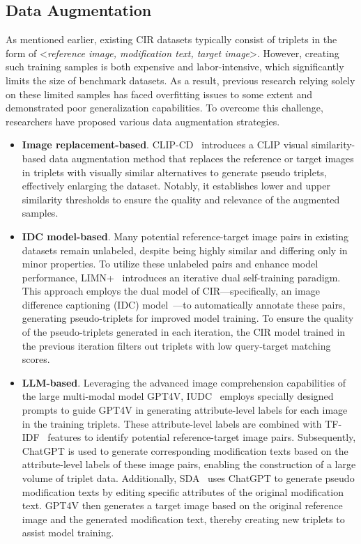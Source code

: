 \subsection{Data Augmentation}
As mentioned earlier, existing CIR datasets typically consist of triplets in the form of \textless \emph{reference image, modification text, target image}\textgreater. However, creating such training samples is both expensive and labor-intensive, which significantly limits the size of benchmark datasets. As a result, previous research relying solely on these limited samples has faced overfitting issues to some extent and demonstrated poor generalization capabilities.
To overcome this challenge, researchers have proposed various data augmentation strategies.
\begin{itemize}
    \item \textbf{Image replacement-based}. CLIP-CD~\cite{lin2023clip_cd} introduces a CLIP visual similarity-based data augmentation method that replaces the reference or target images in triplets with visually similar alternatives to generate pseudo triplets, effectively enlarging the dataset. Notably, it establishes lower and upper similarity thresholds to ensure the quality and relevance of the augmented samples. 
    \item \textbf{IDC model-based}. Many potential reference-target image pairs in existing datasets remain unlabeled, despite being highly similar and differing only in minor properties. To utilize these unlabeled pairs and enhance model performance, LIMN+~\cite{wen2023limn} introduces an iterative dual self-training paradigm. This approach employs the dual model of CIR—specifically, an image difference captioning (IDC) model~\cite{h2018learning}—to automatically annotate these pairs, generating pseudo-triplets for improved model training. To ensure the quality of the pseudo-triplets generated in each iteration, the CIR model trained in the previous iteration filters out triplets with low query-target matching scores.
    \item  \textbf{LLM-based}. Leveraging the advanced image comprehension capabilities of the large multi-modal model GPT4V, IUDC~\cite{ge2024iudc} employs specially designed prompts to guide GPT4V in generating attribute-level labels for each image in the training triplets. These attribute-level labels are combined with TF-IDF~\cite{salton1988term} features to identify potential reference-target image pairs. Subsequently, ChatGPT is used to generate corresponding modification texts based on the attribute-level labels of these image pairs, enabling the construction of a large volume of triplet data. Additionally, SDA~\cite{sda2024} uses ChatGPT to generate pseudo modification texts by editing specific attributes of the original modification text. GPT4V then generates a target image based on the original reference image and the generated modification text, thereby creating new triplets to assist model training. 

\end{itemize}
